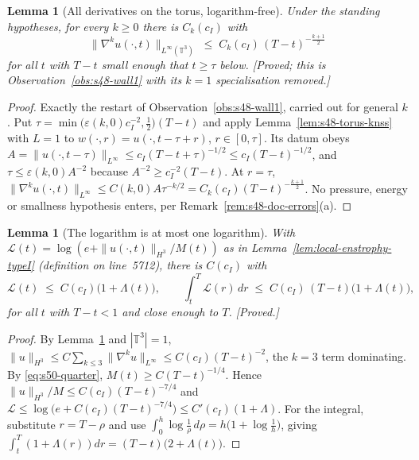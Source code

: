 \documentclass[11pt]{article}
\newtheorem{lemma}[theorem]{Lemma}
\theoremstyle{definition}
\theoremstyle{remark}
\newcommand{\T}{\mathbb{T}}
\begin{document}
\begin{lemma}[All derivatives on the torus, logarithm-free]
  \label{lem:s50-highderiv}
  Under the standing hypotheses, for every $k\geq0$ there is $C_k(c_I)$ with
  \begin{equation}\label{eq:s50-highderiv}
    \bigl\|\nabla^ku(\cdot,t)\bigr\|_{L^\infty(\T^3)}
      \;\leq\; C_k(c_I)\,(T-t)^{-\frac{k+1}{2}}
  \end{equation}
  for all $t$ with $T-t$ small enough that $t\geq\tau$ below.
  \emph{[Proved; this is Observation~\ref{obs:s48-wall1} with its $k=1$
  specialisation removed.]}
\end{lemma}
\begin{proof}
  Exactly the restart of Observation~\ref{obs:s48-wall1}, carried out for
  general $k$. Put
  $\tau=\min\bigl(\varepsilon(k,0)c_I^{-2},\tfrac12\bigr)(T-t)$ and apply
  Lemma~\ref{lem:s48-torus-knss} with $L=1$ to
  $w(\cdot,r)=u(\cdot,t-\tau+r)$, $r\in[0,\tau]$. Its datum obeys
  $A=\|u(\cdot,t-\tau)\|_{L^\infty}\leq c_I(T-t+\tau)^{-1/2}\leq
  c_I(T-t)^{-1/2}$, and $\tau\leq\varepsilon(k,0)A^{-2}$ because
  $A^{-2}\geq c_I^{-2}(T-t)$. At $r=\tau$,
  $\|\nabla^ku(\cdot,t)\|_{L^\infty}\leq C(k,0)A\tau^{-k/2}
  =C_k(c_I)(T-t)^{-\frac{k+1}{2}}$.
  No pressure, energy or smallness hypothesis enters, per
  Remark~\ref{rem:s48-doc-errors}(a).
\end{proof}

\begin{lemma}[The logarithm is at most one logarithm]\label{lem:s50-Lbound}
  With $\mathcal{L}(t)=\log(e+\|u(\cdot,t)\|_{H^3}/M(t))$ as in
  Lemma~\ref{lem:local-enstrophy-typeI} (definition on line~5712), there is
  $C(c_I)$ with
  \[
    \mathcal{L}(t) \;\leq\; C(c_I)\bigl(1+\Lambda(t)\bigr),
    \qquad
    \int_t^T\mathcal{L}(r)\,dr \;\leq\; C(c_I)\,(T-t)\bigl(1+\Lambda(t)\bigr),
  \]
  for all $t$ with $T-t<1$ and close enough to $T$. \emph{[Proved.]}
\end{lemma}
\begin{proof}
  By Lemma~\ref{lem:s50-highderiv} and $|\T^3|=1$,
  $\|u\|_{H^3}\leq C\sum_{k\leq3}\|\nabla^ku\|_{L^\infty}
  \leq C(c_I)(T-t)^{-2}$, the $k=3$ term dominating. By
  \eqref{eq:s50-quarter}, $M(t)\geq C(T-t)^{-1/4}$. Hence
  $\|u\|_{H^3}/M\leq C(c_I)(T-t)^{-7/4}$ and
  $\mathcal{L}\leq\log\bigl(e+C(c_I)(T-t)^{-7/4}\bigr)
  \leq C'(c_I)(1+\Lambda)$. For the integral, substitute $r=T-\rho$ and use
  $\int_0^h\log\frac1\rho\,d\rho=h\bigl(1+\log\frac1h\bigr)$, giving
  $\int_t^T(1+\Lambda(r))dr=(T-t)\bigl(2+\Lambda(t)\bigr)$.
\end{proof}
\end{document}
